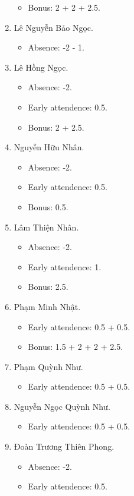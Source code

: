 \documentclass{article}
\begin{document}
\begin{enumerate}
\begin{itemize}
		\item Bonus: 2 + 2 + 2.5.
	\end{itemize}
	\item {\sc Lê Nguyễn Bảo Ngọc.}
	\begin{itemize}
		\item Absence: -2 - 1.
	\end{itemize}
	\item {\sc Lê Hồng Ngọc.}
	\begin{itemize}
		\item Absence: -2.
		\item Early attendence: 0.5.
		\item Bonus: 2 + 2.5.
	\end{itemize}
	\item {\sc Nguyễn Hữu Nhân.}
	\begin{itemize}
		\item Absence: -2.
		\item Early attendence: 0.5.
		\item Bonus: 0.5.
	\end{itemize}
	\item {\sc Lâm Thiện Nhân.}
	\begin{itemize}
		\item Absence: -2.
		\item Early attendence: 1.
		\item Bonus: 2.5.
	\end{itemize}
	\item {\sc Phạm Minh Nhật.}
	\begin{itemize}
		\item Early attendence: 0.5 + 0.5.
		\item Bonus: 1.5 + 2 + 2 + 2.5.
	\end{itemize}
	\item {\sc Phạm Quỳnh Như.}
	\begin{itemize}
		\item Early attendence: 0.5 + 0.5.
	\end{itemize}
	\item {\sc Nguyễn Ngọc Quỳnh Như.}
	\begin{itemize}
		\item Early attendence: 0.5 + 0.5.
	\end{itemize}
	\item {\sc Đoàn Trương Thiên Phong.}
	\begin{itemize}
		\item Absence: -2.
		\item Early attendence: 0.5.

\end{itemize}
\end{enumerate}
\end{document}
